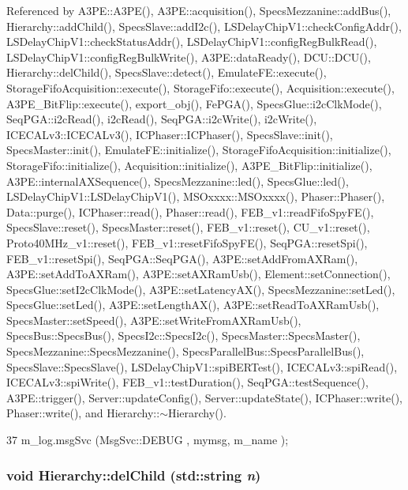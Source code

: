 Referenced by A3PE::A3PE(), A3PE::acquisition(), SpecsMezzanine::addBus(), Hierarchy::addChild(), SpecsSlave::addI2c(), LSDelayChipV1::checkConfigAddr(), LSDelayChipV1::checkStatusAddr(), LSDelayChipV1::configRegBulkRead(), LSDelayChipV1::configRegBulkWrite(), A3PE::dataReady(), DCU::DCU(), Hierarchy::delChild(), SpecsSlave::detect(), EmulateFE::execute(), StorageFifoAcquisition::execute(), StorageFifo::execute(), Acquisition::execute(), A3PE\_\-BitFlip::execute(), export\_\-obj(), FePGA(), SpecsGlue::i2cClkMode(), SeqPGA::i2cRead(), i2cRead(), SeqPGA::i2cWrite(), i2cWrite(), ICECALv3::ICECALv3(), ICPhaser::ICPhaser(), SpecsSlave::init(), SpecsMaster::init(), EmulateFE::initialize(), StorageFifoAcquisition::initialize(), StorageFifo::initialize(), Acquisition::initialize(), A3PE\_\-BitFlip::initialize(), A3PE::internalAXSequence(), SpecsMezzanine::led(), SpecsGlue::led(), LSDelayChipV1::LSDelayChipV1(), MSOxxxx::MSOxxxx(), Phaser::Phaser(), Data::purge(), ICPhaser::read(), Phaser::read(), FEB\_\-v1::readFifoSpyFE(), SpecsSlave::reset(), SpecsMaster::reset(), FEB\_\-v1::reset(), CU\_\-v1::reset(), Proto40MHz\_\-v1::reset(), FEB\_\-v1::resetFifoSpyFE(), SeqPGA::resetSpi(), FEB\_\-v1::resetSpi(), SeqPGA::SeqPGA(), A3PE::setAddFromAXRam(), A3PE::setAddToAXRam(), A3PE::setAXRamUsb(), Element::setConnection(), SpecsGlue::setI2cClkMode(), A3PE::setLatencyAX(), SpecsMezzanine::setLed(), SpecsGlue::setLed(), A3PE::setLengthAX(), A3PE::setReadToAXRamUsb(), SpecsMaster::setSpeed(), A3PE::setWriteFromAXRamUsb(), SpecsBus::SpecsBus(), SpecsI2c::SpecsI2c(), SpecsMaster::SpecsMaster(), SpecsMezzanine::SpecsMezzanine(), SpecsParallelBus::SpecsParallelBus(), SpecsSlave::SpecsSlave(), LSDelayChipV1::spiBERTest(), ICECALv3::spiRead(), ICECALv3::spiWrite(), FEB\_\-v1::testDuration(), SeqPGA::testSequence(), A3PE::trigger(), Server::updateConfig(), Server::updateState(), ICPhaser::write(), Phaser::write(), and Hierarchy::$\sim$Hierarchy().


\begin{DoxyCode}
37 { m_log.msgSvc (MsgSvc::DEBUG   , mymsg, m_name ); }
\end{DoxyCode}
\hypertarget{classHierarchy_a1928ac7615fe0b5e55cd707f70dc6781}{
\subsubsection[{delChild}]{\setlength{\rightskip}{0pt plus 5cm}void Hierarchy::delChild (std::string {\em n})}}
\label{classHierarchy_a1928ac7615fe0b5e55cd707f70dc6781}


